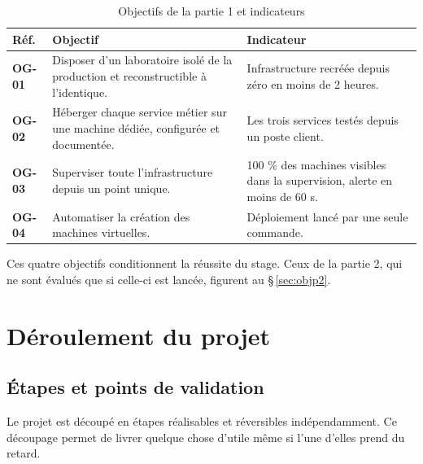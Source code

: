 \documentclass[11pt,a4paper]{article}
\newcommand{\rid}[1]{\textcolor{primary}{\textbf{\small #1}}}
\begin{document}
\begin{table}[H]
\centering
\caption{Objectifs de la partie 1 et indicateurs}
\begin{tabularx}{\textwidth}{L{1.4cm} Y L{4.6cm}}
\toprule
{}\textbf{Réf.} & \textbf{Objectif} & \textbf{Indicateur} \\
\midrule
\rid{OG-01} & Disposer d'un laboratoire isolé de la production et reconstructible à l'identique. & Infrastructure recréée depuis zéro en moins de 2 heures. \\
\rid{OG-02} & Héberger chaque service métier sur une machine dédiée, configurée et documentée. & Les trois services testés depuis un poste client. \\
\rid{OG-03} & Superviser toute l'infrastructure depuis un point unique. & 100 \% des machines visibles dans la supervision, alerte en moins de 60 s. \\
\rid{OG-04} & Automatiser la création des machines virtuelles. & Déploiement lancé par une seule commande. \\
\bottomrule
\end{tabularx}
\end{table}

Ces quatre objectifs conditionnent la réussite du stage. Ceux de la partie 2, qui ne sont évalués que si celle-ci est lancée, figurent au \S\,\ref{sec:objp2}.

\section{Déroulement du projet}

\subsection{Étapes et points de validation}
Le projet est découpé en étapes réalisables et réversibles indépendamment. Ce découpage permet de livrer quelque chose d'utile même si l'une d'elles prend du retard.
\end{document}
